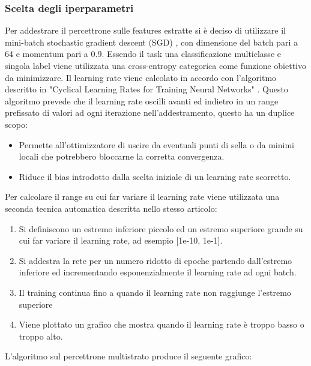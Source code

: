 \subsubsection{Scelta degli iperparametri}
Per addestrare il percettrone sulle features estratte si è deciso di utilizzare il mini-batch stochastic gradient descent (SGD) \cite{kiefer1952}, con dimensione del batch pari a 64 e momentum pari a 0.9.
Essendo il task una classificazione multiclasse e singola label viene utilizzata una cross-entropy categorica come funzione obiettivo da minimizzare.
Il learning rate viene calcolato in accordo con l'algoritmo descritto in "Cyclical Learning Rates for Training Neural Networks" \cite{smith2015cyclical}.
Questo algoritmo prevede che il learning rate oscilli avanti ed indietro in un range prefissato di valori ad ogni iterazione nell'addestramento, questo ha un duplice scopo:
\begin{itemize}
\item Permette all'ottimizzatore di uscire da eventuali punti di sella o da minimi locali che potrebbero bloccarne la corretta convergenza.
\item Riduce il bias introdotto dalla scelta iniziale di un learning rate scorretto.
\end{itemize}
Per calcolare il range su cui far variare il learning rate viene utilizzata una seconda tecnica automatica descritta nello stesso articolo:
\begin{enumerate}
\item Si definiscono un estremo inferiore piccolo ed un estremo superiore grande su cui far variare il learning rate, ad esempio [1e-10, 1e-1].
\item Si addestra la rete per un numero ridotto di epoche partendo dall'estremo inferiore ed incrementando esponenzialmente il learning rate ad ogni batch.
\item Il training continua fino a quando il learning rate non raggiunge l'estremo superiore
\item Viene plottato un grafico che mostra quando il learning rate è troppo basso o troppo alto.
\end{enumerate} 
L'algoritmo sul percettrone multistrato produce il seguente grafico:

